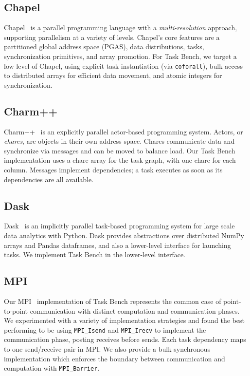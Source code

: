\subsection{Chapel}

Chapel~\cite{Chapel15} is a parallel programming language
with a \emph{multi-res\-o\-lu\-tion} approach, supporting parallelism at a variety of
levels. Chapel's core features are a partitioned global address space
(PGAS), data distributions, tasks,
synchronization primitives, and array promotion. For Task Bench, we target a low level of
Chapel, using explicit task instantiation (via
\lstinline[language=Chapel]{coforall}), bulk access to distributed
arrays for efficient data movement, and atomic integers for
synchronization.

\subsection{Charm++}

Charm++~\cite{Charmpp93} is an explicitly parallel actor-based programming system. Actors, or
\emph{chares}, are objects in their own address space.
Chares communicate data and synchronize via messages and can be moved
to balance load. Our Task Bench implementation uses a chare
array for the task graph, with one chare for each column. Messages implement dependencies; a task executes as soon as its
dependencies are all available.



\subsection{Dask}

Dask~\cite{Dask15} is an implicitly parallel task-based programming system for large
scale data analytics with Python. Dask provides abstractions over
distributed NumPy arrays and Pandas dataframes, and also a lower-level
interface for launching tasks. We implement Task Bench in the lower-level interface.

\subsection{MPI}

Our MPI~\cite{MPI} implementation of Task Bench represents the common
case of point-to-point communication with distinct computation and
communication phases. We experimented with a variety of implementation
strategies and found the best performing to be using
\lstinline[language=C++]{MPI_Isend} and
\lstinline[language=C++]{MPI_Irecv} to implement the communication
phase, posting receives before sends. Each task dependency maps to one
send/receive pair in MPI. We also provide a bulk synchronous
implementation which enforces the boundary between communication and
computation with \lstinline[language=C++]{MPI_Barrier}.

